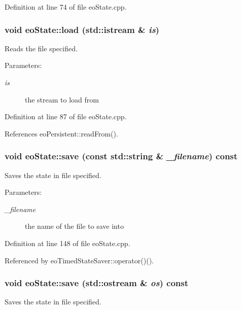 Definition at line 74 of file eo\-State.cpp.
\subsubsection{\setlength{\rightskip}{0pt plus 5cm}void eo\-State::load (std::istream \& {\em is})}\label{classeo_state_a6}


Reads the file specified. 

\begin{Desc}
\item[Parameters:]
\begin{description}
\item[{\em is}]the stream to load from \end{description}
\end{Desc}


Definition at line 87 of file eo\-State.cpp.

References eo\-Persistent::read\-From().
\subsubsection{\setlength{\rightskip}{0pt plus 5cm}void eo\-State::save (const std::string \& {\em \_\-filename}) const}\label{classeo_state_a7}


Saves the state in file specified. 

\begin{Desc}
\item[Parameters:]
\begin{description}
\item[{\em \_\-filename}]the name of the file to save into \end{description}
\end{Desc}


Definition at line 148 of file eo\-State.cpp.

Referenced by eo\-Timed\-State\-Saver::operator()().
\subsubsection{\setlength{\rightskip}{0pt plus 5cm}void eo\-State::save (std::ostream \& {\em os}) const}\label{classeo_state_a8}


Saves the state in file specified. 


